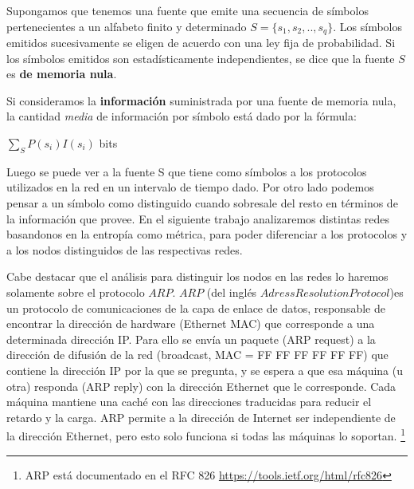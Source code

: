 Supongamos que tenemos una fuente que emite una secuencia de símbolos pertenecientes a un alfabeto finito y determinado $S = \{s_1, s_2, .., s_q\}$. Los símbolos emitidos sucesivamente se eligen de acuerdo con una ley fija de probabilidad. Si los símbolos emitidos son estadísticamente independientes, se dice que la fuente $S$ es \textbf{de memoria nula}.

Si consideramos la \textbf{información} suministrada por una fuente de memoria nula, la cantidad \emph{media} de información por símbolo está dado por la fórmula:
\begin{center}
    $\displaystyle \sum_S P(s_i) I(s_i)$ bits
\end{center}


Luego se puede ver a la fuente S que tiene como símbolos a los protocolos utilizados en la red en un intervalo de tiempo dado.
Por otro lado podemos pensar a un símbolo como distinguido cuando sobresale del resto en términos de la información que provee.
En el siguiente trabajo analizaremos distintas redes basandonos en la entropía como métrica, 
para poder diferenciar a los protocolos y a los nodos distinguidos de las respectivas redes.

Cabe destacar que el análisis para distinguir los nodos en las redes lo haremos solamente sobre el protocolo $ARP$.
$ARP$ (del inglés $Adress Resolution Protocol$)es un protocolo de comunicaciones de la capa de enlace de datos, responsable de encontrar la dirección de hardware (Ethernet MAC) que corresponde a una determinada dirección IP. Para ello se envía un paquete (ARP request) a la dirección de difusión de la red (broadcast, MAC = FF FF FF FF FF FF) que contiene la dirección IP por la que se pregunta, y se espera a que esa máquina (u otra) responda (ARP reply) con la dirección Ethernet que le corresponde. Cada máquina mantiene una caché con las direcciones traducidas para reducir el retardo y la carga. ARP permite a la dirección de Internet ser independiente de la dirección Ethernet, pero esto solo funciona si todas las máquinas lo soportan.
 \footnote{ARP está documentado en el RFC 826 \url{https://tools.ietf.org/html/rfc826}}
